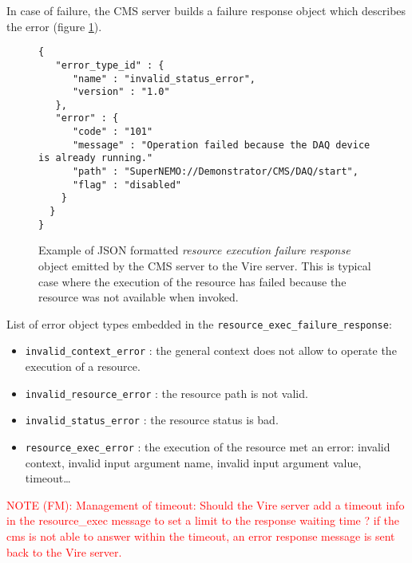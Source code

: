 

In case of failure, the CMS server builds a failure response object which
describes the error (figure  \ref{cms:json:resource_exec_response_2}).

  \begin{figure}[h]
  \footnotesize
  \begin{Verbatim}[frame=single,xleftmargin=0.cm,label=\fbox{\texttt{JSON}}]
{
   "error_type_id" : {
      "name" : "invalid_status_error",
      "version" : "1.0"
   },
   "error" : {
      "code" : "101"
      "message" : "Operation failed because the DAQ device is already running."
      "path" : "SuperNEMO://Demonstrator/CMS/DAQ/start",
      "flag" : "disabled"
    }
  }
}
\end{Verbatim}
  \normalsize
  \caption{Example of  JSON formatted \emph{resource  execution failure response} object
    emitted by  the CMS server to  the Vire server. This is typical case where
    the execution of the resource has failed because the resource was not available
    when invoked.
  }
  \label{cms:json:resource_exec_response_2}
  \end{figure}

List of error object types embedded in the  \texttt{resource\_exec\_failure\_response}:

\begin{itemize}

\item  \texttt{invalid\_context\_error} :  the general context does
  not allow to operate the execution of a resource.

\item \texttt{invalid\_resource\_error} : the resource path is not valid.

\item \texttt{invalid\_status\_error} : the resource status is bad.

\item  \texttt{resource\_exec\_error}  :  the  execution  of  the
  resource met an error: invalid context, invalid input argument name,
  invalid input argument value, timeout\dots

\end{itemize}

\vskip 5mm
  \par\textcolor{red}{NOTE (FM): Management of timeout:
    Should the Vire server add a timeout info in the resource\_exec message
    to set a limit to the response waiting time ?  if the cms is not able to answer
    within the timeout, an error response message is sent back to the Vire server.
  }

